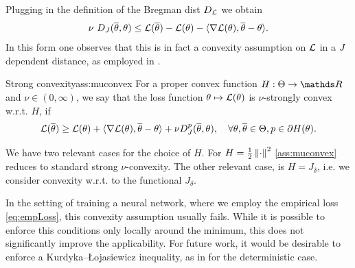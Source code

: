 %
Plugging in the definition of the Bregman dist $D_{\mathcal{L}}$ we obtain
%
\begin{align*}
	\nu\ D_J(\overline\theta,\theta) \leq \mathcal{L}(\overline\theta) - \mathcal{L}(\theta) - 
	\langle \nabla\mathcal{L}(\theta), \overline\theta-\theta\rangle.
\end{align*}
%
In this form one observes that this is in fact a convexity assumption on $\mathcal{L}$ in a $J$ dependent distance, as employed in \cite{bungert2022bregman}.
%
%
\begin{assumption}{Strong convexity}{ass:muconvex} 
	For a proper convex function $H:\Param\to\R$ and $\nu\in(0,\infty)$, we say that the loss function $\theta\mapsto\mathcal{L}(\theta)$ is $\nu$-strongly convex w.r.t. $H$, if
	\begin{align}
		\mathcal{L}(\overline\theta) \geq \mathcal{L}(\theta) + \langle\nabla\mathcal{L}(\theta), \overline\theta - \theta\rangle + \nu D_J^p(\overline\theta,\theta),\quad\forall\theta,\overline\theta\in\Theta, p\in\partial H(\theta).
	\end{align}
\end{assumption}
%
%
\begin{remark}{}{}
	We have two relevant cases for the choice of $H$. For $H=\frac{1}{2}\left\|\cdot\right\|^2$ \cref{ass:muconvex} reduces to standard strong $\nu$-convexity. The other relevant case, is $H=J_\delta$, i.e. we consider convexity w.r.t. to the functional $J_\delta$.
\end{remark}
%
%
\begin{remark}{}{}
	In the setting of training a neural network, where we employ the empirical loss \cref{eq:empLoss}, this convexity assumption usually fails. While it is possible to enforce this conditions only locally around the minimum, this does not significantly improve the applicability. For future work, it would be desirable to enforce a  Kurdyka--\L ojasiewicz inequality, as in \cite{benning2018choose} for the deterministic case. 
\end{remark}


